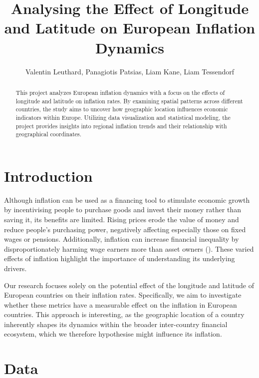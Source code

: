 \documentclass{article}
\title{Analysing the Effect of Longitude and Latitude on European Inflation Dynamics}
\author{Valentin Leuthard, Panagiotis Patsias, Liam Kane, Liam Tessendorf}
\begin{document}
    \maketitle
    \vspace{\baselineskip}
    \vspace{\baselineskip}    
    \vspace{\baselineskip}
    \begin{abstract}
    This project analyzes European inflation dynamics with a focus on the effects of longitude and latitude on inflation rates. By examining spatial patterns across different countries, the study aims to uncover how geographic location influences economic indicators within Europe. Utilizing data visualization and statistical modeling, the project provides insights into regional inflation trends and their relationship with geographical coordinates.
    \end{abstract}
    \newpage

    \tableofcontents
    \newpage

    \section{Introduction}

    Although inflation can be used as a financing tool to stimulate economic growth by incentivising people to purchase goods and invest their money rather than saving it, its benefits are limited. Rising prices erode the value of money and reduce people's purchasing power, negatively affecting especially those on fixed wages or pensions. Additionally, inflation can increase financial inequality by disproportionately harming wage earners more than asset owners (\cite{TheEffectofInflationonEconomicDevelopment}). These varied effects of inflation highlight the importance of understanding its underlying drivers.

    Our research focuses solely on the potential effect of the longitude and latitude of European countries on their inflation rates. Specifically, we aim to investigate whether these metrics have a measurable effect on the inflation in European countries. This approach is interesting, as the geographic location of a country inherently shapes its dynamics within the broader inter-country financial ecosystem, which we therefore hypothesise might influence its inflation.

    \section{Data}
    
\end{document}

